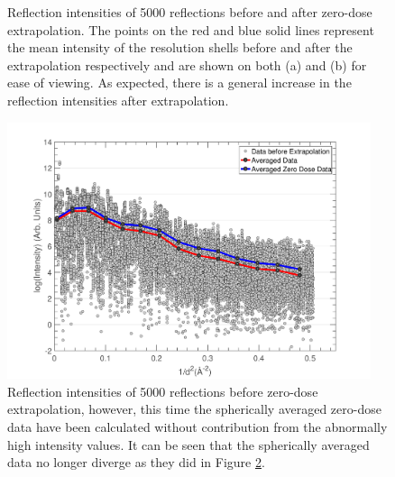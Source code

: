 \begin{figure}
\begin{subfigure}[b]{0.95\textwidth}
		\caption{}
		\label{fig:After extrapolation all observations - Extrapolation method}
	\end{subfigure}
	\caption[Reflection intensities of 5000 reflections before and after zero-dose extrapolation.]{Reflection intensities of 5000 reflections before and after zero-dose extrapolation.
	The points on the red and blue solid lines represent the mean intensity of the resolution shells before and after the extrapolation respectively and are shown on both (a) and (b) for ease of viewing.
	As expected, there is a general increase in the reflection intensities after extrapolation.}
	\label{fig:Before and after extrapolation results - Extrapolation method}
\end{figure}

\begin{figure}
  \centering
    \includegraphics[width=0.95\textwidth]{figures/zde/IntensityCurve_BeforeExtrapolation_WithoutHighI.pdf}
    \caption[Reflection intensities of 5000 reflections before zero-dose extrapolation and the spherically averaged zero-dose data have been calculated without contribution from the abnormally high intensity values.]{Reflection intensities of 5000 reflections before zero-dose extrapolation, however, this time the spherically averaged zero-dose data have been calculated without contribution from the abnormally high intensity values.
	It can be seen that the spherically averaged data no longer diverge as they did in Figure \ref{fig:Before and after extrapolation results - Extrapolation method}.}
    \label{fig:Spherically averaged without high intensities - Extrapolation method}
\end{figure}
